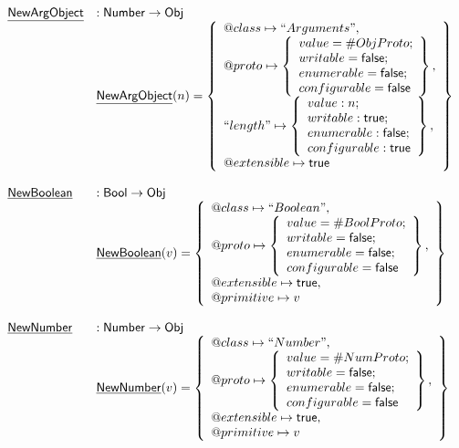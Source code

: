 \documentclass{article}
\makeatletter
\newcommand{\SF}[1]{\mbox{\textsf{#1}}}
\newcommand{\Obj}{\SF{Obj}}
\newcommand{\set}[1]{\left\{\begin{array}{l}#1\end{array}\right\}}
\newcommand{\hf}[1]{\underline{\sf #1}}
\newcommand{\varloc}[1]{\##1}
\newcommand{\varprop}[1]{@#1}
\newcommand{\vtrue}{\SF{true}}
\newcommand{\vfalse}{\SF{false}}
\makeatother
\begin{document}
\[
\begin{array}{ll}

\hf{NewArgObject} & : \SF{Number} \rightarrow \Obj \\
& \hf{NewArgObject}(n) = \set{
    \varprop{class}\mapsto ``Arguments",\\
    \varprop{proto}\mapsto 
    \set{
      value=\varloc{ObjProto};\\writable=\vfalse;\\
      enumerable=\vfalse;\\configurable=\vfalse
    },\\
   ``length"\mapsto \set{
       value:n;\\
       writable:\vtrue;\\
       enumerable:\vfalse;\\
       configurable:\vtrue
     },\\
    \varprop{extensible}\mapsto \vtrue
}\\\\

\hf{NewBoolean} & : \SF{Bool} \rightarrow \Obj \\
& \hf{NewBoolean}(v) = \set{
    \varprop{class}\mapsto ``Boolean",\\
    \varprop{proto}\mapsto 
    \set{
      value=\varloc{BoolProto};\\writable=\vfalse;\\
      enumerable=\vfalse;\\configurable=\vfalse
    },\\
    \varprop{extensible}\mapsto \vtrue, \\
    \varprop{primitive}\mapsto v
}\\\\

\hf{NewNumber} & : \SF{Number} \rightarrow \Obj \\
& \hf{NewNumber}(v) = \set{
    \varprop{class}\mapsto ``Number",\\
    \varprop{proto}\mapsto 
    \set{
      value=\varloc{NumProto};\\writable=\vfalse;\\
      enumerable=\vfalse;\\configurable=\vfalse
    },\\
    \varprop{extensible}\mapsto \vtrue, \\
    \varprop{primitive}\mapsto v
}\\\\


\end{array}\]
\end{document}
